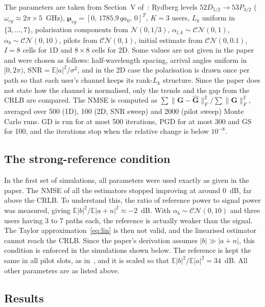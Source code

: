 \documentclass[11pt,a4paper]{article}
\begin{document}
The parameters are taken from Section~V of~\cite{xu2025channel}: Rydberg levels
$52D_{5/2}\rightarrow53P_{3/2}$ ($\omega_{eg}\approx2\pi\times5$~GHz),
$\boldsymbol\mu_{eg}=[0,\,1785.9\,qa_0,\,0]^T$, $K=3$ users, $L_k$ uniform in $\{3,\dots,7\}$,
polarisation components from $\mathcal N(0,1/3)$, $\alpha_{l,k}\sim\mathcal{CN}(0,1)$,
$\alpha_b\sim\mathcal{CN}(0,10)$, pilots from $\mathcal{CN}(0,1)$, initial estimate from
$\mathcal{CN}(0,0.1)$, $I=8$ cells for 1D and $8\times8$ cells for 2D. Some values are not given
in the paper and were chosen as follows: half-wavelength spacing, arrival angles uniform in
$[0,2\pi)$, $\mathrm{SNR}=\mathbb E|a|^2/\sigma^2$, and in the 2D case the polarisation is drawn
once per path so that each user's channel keeps its rank-$L_k$ structure. Since the paper does not
state how the channel is normalised, only the trends and the gap from the CRLB are compared. The NMSE is computed as
$\sum\|\mathbf G-\hat{\mathbf G}\|_F^2/\sum\|\mathbf G\|_F^2$, averaged over 500 (1D), 100 (2D, SNR
sweep) and 2000 (pilot sweep) Monte Carlo runs. GD is run for at most 500 iterations, PGD for at
most 300 and GS for 100, and the iterations stop when the relative change is below $10^{-8}$.

\subsection{The strong-reference condition}

In the first set of simulations, all parameters were used exactly as given in the paper. The NMSE of
all the estimators stopped improving at around $0$~dB, far above the CRLB. To understand this,
the ratio of reference power to signal power was measured, giving
$\mathbb E|b|^2/\mathbb E|a+n|^2\approx-2$~dB. With $\alpha_b\sim\mathcal{CN}(0,10)$ and three users
having 3 to 7 paths each, the reference is actually weaker than the signal. The Taylor
approximation~\eqref{eq:lin} is then not valid, and the linearised estimator cannot reach the
CRLB. Since the paper's derivation assumes $|b|\gg|a+n|$, this condition is enforced in the
simulations shown below. The reference is kept the same in all pilot slots, as
in~\cite{cui2025towards}, and it is scaled so that $\mathbb E|b|^2/\mathbb E|a|^2=34$~dB. All other
parameters are as listed above.

\subsection{Results}
\end{document}
